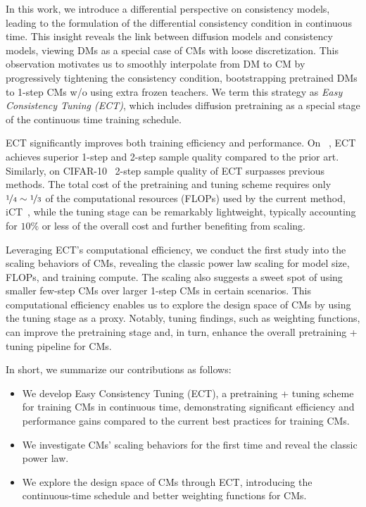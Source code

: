 \documentclass{article}
\begin{document}
In this work, we introduce a differential perspective on consistency models, leading to the formulation of the differential consistency condition in continuous time. This insight reveals the link between diffusion models and consistency models, viewing DMs as a special case of CMs with loose discretization.
This observation motivates us to smoothly interpolate from DM to CM by progressively tightening the consistency condition, bootstrapping pretrained DMs to 1-step CMs w/o using extra frozen teachers.
We term this strategy as \emph{Easy Consistency Tuning (ECT)}, which includes diffusion pretraining as a special stage of the continuous time training schedule.

ECT significantly improves both training efficiency and performance. On \imgnet~\citep{imagenet}, ECT achieves superior 1-step and 2-step sample quality compared to the prior art. Similarly, on CIFAR-10~\citep{cifar} 2-step sample quality of ECT surpasses previous methods.  The total cost of the pretraining and tuning scheme requires only $\nicefrac{1}{4} \sim \nicefrac{1}{3}$ of the computational resources (FLOPs) used by the current \sota method, iCT~\citep{ict}, while the tuning stage can be remarkably lightweight, typically accounting for $10\%$ or less of the overall cost and further benefiting from scaling.

Leveraging ECT's computational efficiency, we conduct the first study into the scaling behaviors of CMs, revealing the classic power law scaling for model size, FLOPs, and training compute. 
The scaling also suggests a sweet spot of using smaller few-step CMs over larger 1-step CMs in certain scenarios. 
This computational efficiency enables us to explore the design space of CMs by using the tuning stage as a proxy. Notably, tuning findings, such as weighting functions, can improve the pretraining stage and, in turn, enhance the overall pretraining + tuning pipeline for CMs.

In short, we summarize our contributions as follows:
\begin{itemize}
    \item  We develop Easy Consistency Tuning (ECT), a pretraining + tuning scheme for training CMs in continuous time, demonstrating significant efficiency and performance gains compared to the current best practices for training CMs.
    \item We investigate CMs' scaling behaviors for the first time and reveal the classic power law.
    \item We explore the design space of CMs through ECT, introducing the continuous-time schedule and better weighting functions for CMs.
\end{itemize}
\end{document}
